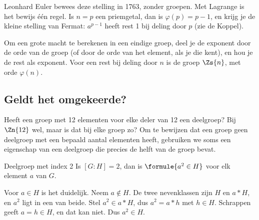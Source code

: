 Leonhard Euler bewees deze stelling in 1763, zonder groepen. Met Lagrange is het bewijs één regel. Is $n = p$ een priemgetal, dan is $\varphi(p) = p - 1$, en krijg je de kleine stelling van Fermat: $a^{p - 1}$ heeft rest 1 bij deling door $p$ (zie de Koppel).


\begin{werkwijze}
Om een grote macht te berekenen in een eindige groep, deel je de exponent door de orde van de groep (of door de orde van het element, als je die kent), en hou je de rest als exponent. Voor een rest bij deling door $n$ is de groep $\Zs{n}$, met orde $\varphi(n)$.
\end{werkwijze}

\begin{oefeningen}
\end{oefeningen}

\subsection{Geldt het omgekeerde?}

Heeft een groep met 12 elementen voor elke deler van 12 een deelgroep? Bij $\Zn{12}$ wel, maar is dat bij elke groep zo? Om te bewijzen dat een groep geen deelgroep met een bepaald aantal elementen heeft, gebruiken we soms een eigenschap van een deelgroep die precies de helft van de groep bevat.

\begin{theorie}
\begin{stelling}{Deelgroep met index 2}
Is $[G : H] = 2$, dan is \qquad $\formule{a^2 \in H}$ \qquad voor elk element $a$ van $G$.
\end{stelling}

\begin{bewijs}
Voor $a \in H$ is het duidelijk. Neem $a \notin H$. De twee nevenklassen zijn $H$ en $a \ast H$, en $a^2$ ligt in een van beide. Stel $a^2 \in a \ast H$, dus $a^2 = a \ast h$ met $h \in H$. Schrappen geeft $a = h \in H$, en dat kan niet. Dus $a^2 \in H$.
\end{bewijs}
\end{theorie}

